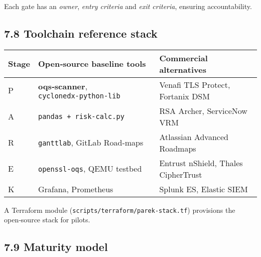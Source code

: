 \documentclass[
  english,
]{article}
\begin{document}
Each gate has an \emph{owner}, \emph{entry criteria} and \emph{exit
criteria}, ensuring accountability.

\subsection{7.8 Toolchain reference
stack}\label{toolchain-reference-stack}

\begin{longtable}[]{@{}
  >{\raggedright\arraybackslash}p{}
  >{\raggedright\arraybackslash}p{}
  >{\raggedright\arraybackslash}p{}@{}}
\toprule\noalign{}
\begin{minipage}[b]{\linewidth}\raggedright
Stage
\end{minipage} & \begin{minipage}[b]{\linewidth}\raggedright
Open‑source baseline tools
\end{minipage} & \begin{minipage}[b]{\linewidth}\raggedright
Commercial alternatives
\end{minipage} \\
\midrule\noalign{}
\endhead
\bottomrule\noalign{}
\endlastfoot
P & \textbf{oqs‑scanner}, \texttt{cyclonedx‑python‑lib} & Venafi TLS
Protect, Fortanix DSM \\
A & \texttt{pandas~+~risk‑calc.py} & RSA Archer, ServiceNow VRM \\
R & \texttt{ganttlab}, GitLab Road‑maps & Atlassian Advanced Roadmaps \\
E & \texttt{openssl‑oqs}, QEMU testbed & Entrust nShield, Thales
CipherTrust \\
K & Grafana, Prometheus & Splunk ES, Elastic SIEM \\
\end{longtable}

A Terraform module (\texttt{scripts/terraform/parek‑stack.tf})
provisions the open‑source stack for pilots.

\subsection{7.9 Maturity model}\label{maturity-model}
\end{document}
